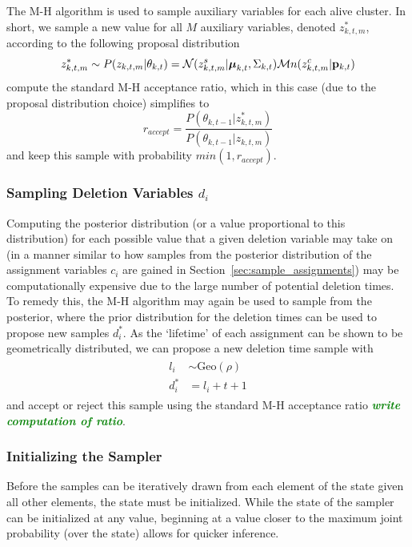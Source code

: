 \documentclass[smallcondensed, final]{svjour3}
\newcommand{\willie}[1]{\textcolor{green}{\textsf{\emph{\textbf{\textcolor{green}{#1}}}}}}
\begin{document}
The M-H algorithm is used to sample auxiliary variables for each alive cluster. In short, we sample a new value for all $M$ auxiliary variables, denoted $z_{k,t,m}^{*}$, according to the following proposal distribution
\begin{equation}
z_{k,t,m}^{*}  \sim  P(z_{k,t,m} | \theta_{k,t}) = \mathcal{N}(z_{k,t,m}^{s} | \boldsymbol{\mu}_{k,t}, \Sigma_{k,t}) \mathcal{M}n(z_{k,t,m}^{c} | \bold{p}_{k,t})
\end{equation}
compute the standard M-H acceptance ratio, which in this case (due to the proposal distribution choice) simplifies to 
\begin{equation}
r_{accept} = \frac{P(\theta_{k,t-1} | z_{k,t,m}^{*})}{P(\theta_{k,t-1} | z_{k,t,m})}
\end{equation}
and keep this sample with probability $min(1, r_{accept})$.





\subsubsection{Sampling Deletion Variables $d_{i}$}
Computing the posterior distribution (or a value proportional to this distribution) for each possible value that a given deletion variable may take on (in a manner similar to how samples from the posterior distribution of the assignment variables $c_{i}$ are gained in Section~\ref{sec:sample_assignments}) may be computationally expensive due to the large number of potential deletion times. To remedy this, the M-H algorithm may again be used to sample from the posterior, where the prior distribution for the deletion times can be used to propose new samples $d_{i}^{*}$. As the `lifetime' of each assignment can be shown to be geometrically distributed, we can propose a new deletion time sample with
\begin{align}
\begin{split}
l_{i}  &\sim  \text{Geo}(\rho)  \\
d_{i}^{*}  &= l_{i} + t + 1
\end{split}
\end{align}
and accept or reject this sample using the standard M-H acceptance ratio \willie{write computation of ratio}.





\subsubsection{Initializing the Sampler}
Before the samples can be iteratively drawn from each element of the state given all other elements, the state must be initialized. While the state of the sampler can be initialized at any value, beginning at a value closer to the maximum joint probability (over the state) allows for quicker inference.
\end{document}
